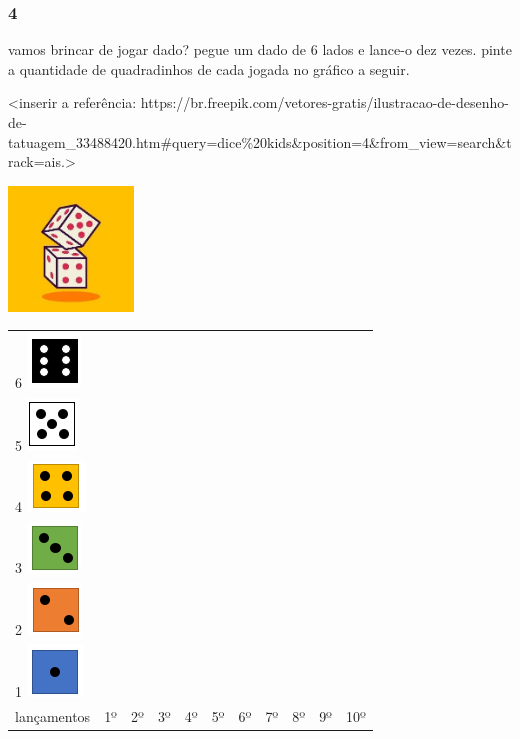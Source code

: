 \subsubsection{4}\label{section-79}

vamos brincar de jogar dado? pegue um dado de 6 lados e lance-o dez
vezes. pinte a quantidade de quadradinhos de cada jogada no gráfico
a seguir.

\textless{}inserir a referência:
https://br.freepik.com/vetores-gratis/ilustracao-de-desenho-de-tatuagem\_33488420.htm\#query=dice\%20kids\&position=4\&from\_view=search\&track=ais.\textgreater{}

\includegraphics[width=1.31250in,height=1.31250in]{media/image97.jpg}

\begin{longtable}[]{@{}lllllllllll@{}}
\toprule
6 \includegraphics[width=0.56258in,height=0.57300in]{media/image98.png}
& & & & & & & & & &\tabularnewline
5 \includegraphics[width=0.53132in,height=0.55216in]{media/image99.png}
& & & & & & & & & &\tabularnewline
4 \includegraphics[width=0.61467in,height=0.53132in]{media/image100.png}
& & & & & & & & & &\tabularnewline
3 \includegraphics[width=0.56258in,height=0.53132in]{media/image101.png}
& & & & & & & & & &\tabularnewline
2 \includegraphics[width=0.57300in,height=0.54174in]{media/image102.png}
& & & & & & & & & &\tabularnewline
1 \includegraphics[width=0.58341in,height=0.55216in]{media/image103.png}
& & & & & & & & & &\tabularnewline
lançamentos & 1º & 2º & 3º & 4º & 5º & 6º & 7º & 8º & 9º &
10º\tabularnewline
\bottomrule
\end{longtable}

